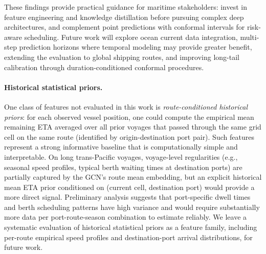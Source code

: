 \documentclass[conference]{IEEEtran}
\begin{document}
These findings provide practical guidance for maritime stakeholders: invest in feature engineering and knowledge distillation before pursuing complex deep architectures, and complement point predictions with conformal intervals for risk-aware scheduling.
Future work will explore ocean current data integration, multi-step prediction horizons where temporal modeling may provide greater benefit, extending the evaluation to global shipping routes, and improving long-tail calibration through duration-conditioned conformal procedures.

\paragraph{Historical statistical priors.}
One class of features not evaluated in this work is \textit{route-conditioned historical priors}: for each observed vessel position, one could compute the empirical mean remaining ETA averaged over all prior voyages that passed through the same grid cell on the same route (identified by origin-destination port pair).
Such features represent a strong informative baseline that is computationally simple and interpretable.
On long trans-Pacific voyages, voyage-level regularities (e.g., seasonal speed profiles, typical berth waiting times at destination ports) are partially captured by the GCN's route mean embedding, but an explicit historical mean ETA prior conditioned on (current cell, destination port) would provide a more direct signal.
Preliminary analysis suggests that port-specific dwell times and berth scheduling patterns have high variance and would require substantially more data per port-route-season combination to estimate reliably.
We leave a systematic evaluation of historical statistical priors as a feature family, including per-route empirical speed profiles and destination-port arrival distributions, for future work.




\end{document}
